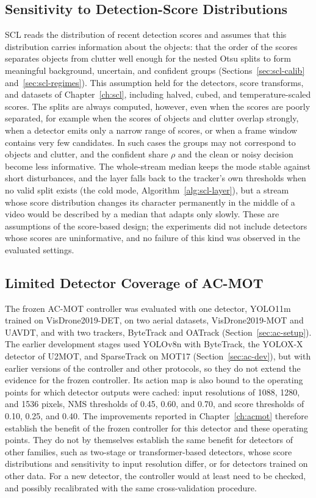 \subsection{Sensitivity to Detection-Score Distributions}\label{sec:lim-scores}
SCL reads the distribution of recent detection scores and assumes that this distribution carries information about the objects: that the order of the scores separates objects from clutter well enough for the nested Otsu splits to form meaningful background, uncertain, and confident groups (Sections~\ref{sec:scl-calib} and~\ref{sec:scl-regimes}). This assumption held for the detectors, score transforms, and datasets of Chapter~\ref{ch:scl}, including halved, cubed, and temperature-scaled scores. The splits are always computed, however, even when the scores are poorly separated, for example when the scores of objects and clutter overlap strongly, when a detector emits only a narrow range of scores, or when a frame window contains very few candidates. In such cases the groups may not correspond to objects and clutter, and the confident share $\rho$ and the clean or noisy decision become less informative. The whole-stream median keeps the mode stable against short disturbances, and the layer falls back to the tracker's own thresholds when no valid split exists (the cold mode, Algorithm~\ref{alg:scl-layer}), but a stream whose score distribution changes its character permanently in the middle of a video would be described by a median that adapts only slowly. These are assumptions of the score-based design; the experiments did not include detectors whose scores are uninformative, and no failure of this kind was observed in the evaluated settings.

\subsection{Limited Detector Coverage of AC-MOT}\label{sec:lim-detectors}
The frozen AC-MOT controller was evaluated with one detector, YOLO11m trained on VisDrone2019-DET, on two aerial datasets, VisDrone2019-MOT and UAVDT, and with two trackers, ByteTrack and OATrack (Section~\ref{sec:ac-setup}). The earlier development stages used YOLOv8n with ByteTrack, the YOLOX-X detector of U2MOT, and SparseTrack on MOT17 (Section~\ref{sec:ac-dev}), but with earlier versions of the controller and other protocols, so they do not extend the evidence for the frozen controller. Its action map is also bound to the operating points for which detector outputs were cached: input resolutions of 1088, 1280, and 1536 pixels, NMS thresholds of 0.45, 0.60, and 0.70, and score thresholds of 0.10, 0.25, and 0.40. The improvements reported in Chapter~\ref{ch:acmot} therefore establish the benefit of the frozen controller for this detector and these operating points. They do not by themselves establish the same benefit for detectors of other families, such as two-stage or transformer-based detectors, whose score distributions and sensitivity to input resolution differ, or for detectors trained on other data. For a new detector, the controller would at least need to be checked, and possibly recalibrated with the same cross-validation procedure.

